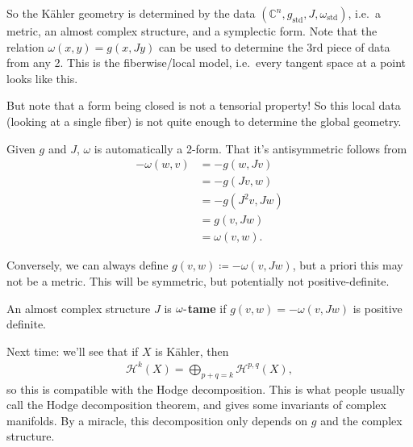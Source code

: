 \begin{remark}

So the Kähler geometry is determined by the data
\(({\mathbb{C}}^n, g_\text{std}, J, \omega_\text{std})\), i.e.~a metric,
an almost complex structure, and a symplectic form. Note that the
relation \(\omega(x, y) = g(x, Jy)\) can be used to determine the 3rd
piece of data from any 2. This is the fiberwise/local model, i.e.~every
tangent space at a point looks like this.

\end{remark}

\begin{warnings}

But note that a form being closed is not a tensorial property! So this
local data (looking at a single fiber) is not quite enough to determine
the global geometry.

\end{warnings}

\begin{remark}

Given \(g\) and \(J\), \(\omega\) is automatically a 2-form. That it's
antisymmetric follows from
\begin{align*}
-\omega(w, v)
&= -g(w, Jv) \\
&= -g(Jv, w) \\
&= -g(J^2 v, Jw)\\
&= g(v, Jw)\\
&= \omega(v, w)
.\end{align*}

Conversely, we can always define \(g(v, w) \coloneqq- \omega(v, Jw)\),
but a priori this may not be a metric. This will be symmetric, but
potentially not positive-definite.

\end{remark}

\begin{definition}[?]

An almost complex structure \(J\) is \textbf{\(\omega{\hbox{-}}\)tame}
if \(g(v, w) = - \omega(v, Jw)\) is positive definite.

\end{definition}

\begin{remark}

Next time: we'll see that if \(X\) is Kähler, then
\begin{align*} 
{\mathcal{H}}^k(X) = \bigoplus_{p+q=k} {\mathcal{H}}^{p, q}(X), 
\end{align*}
so this is compatible with the Hodge decomposition. This is what people
usually call the Hodge decomposition theorem, and gives some invariants
of complex manifolds. By a miracle, this decomposition only depends on
\(g\) and the complex structure.

\end{remark}

